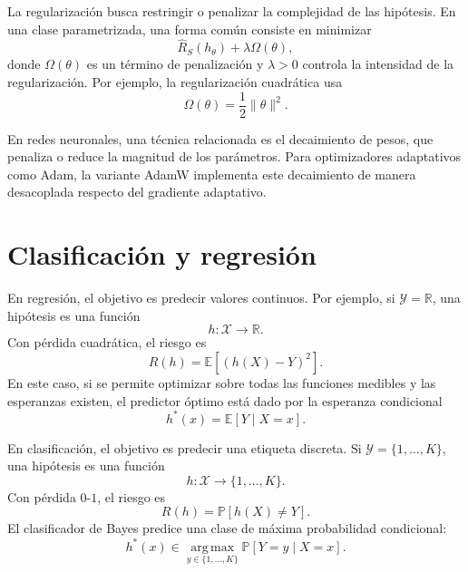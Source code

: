 \documentclass[11pt]{report}
\theoremstyle{definition}
\theoremstyle{plain}
\numberwithin{equation}{section}
\begin{document}
La regularización busca restringir o penalizar la complejidad de las hipótesis. En una clase parametrizada, una forma común consiste en minimizar
\begin{equation*}
    \widehat{R}_S(h_\theta)
    +
    \lambda\Omega(\theta),
\end{equation*}
donde \(\Omega(\theta)\) es un término de penalización y \(\lambda>0\) controla la intensidad de la regularización. Por ejemplo, la regularización cuadrática usa
\begin{equation*}
    \Omega(\theta)
    =
    \frac{1}{2}\|\theta\|^2.
\end{equation*}

En redes neuronales, una técnica relacionada es el decaimiento de pesos, que penaliza o reduce la magnitud de los parámetros. Para optimizadores adaptativos como Adam, la variante AdamW implementa este decaimiento de manera desacoplada respecto del gradiente adaptativo.

\section{Clasificación y regresión}

En regresión, el objetivo es predecir valores continuos. Por ejemplo, si \(\mathcal{Y}=\mathbb{R}\), una hipótesis es una función
\begin{equation*}
    h:\mathcal{X}\to\mathbb{R}.
\end{equation*}
Con pérdida cuadrática, el riesgo es
\begin{equation*}
    R(h)
    =
    \mathbb{E}[(h(X)-Y)^2].
\end{equation*}
En este caso, si se permite optimizar sobre todas las funciones medibles y las esperanzas existen, el predictor óptimo está dado por la esperanza condicional
\begin{equation*}
    h^*(x)
    =
    \mathbb{E}[Y\mid X=x].
\end{equation*}

En clasificación, el objetivo es predecir una etiqueta discreta. Si \(\mathcal{Y}=\{1,\ldots,K\}\), una hipótesis es una función
\begin{equation*}
    h:\mathcal{X}\to\{1,\ldots,K\}.
\end{equation*}
Con pérdida \(0\)-\(1\), el riesgo es
\begin{equation*}
    R(h)
    =
    \mathbb{P}[h(X)\neq Y].
\end{equation*}
El clasificador de Bayes predice una clase de máxima probabilidad condicional:
\begin{equation*}
    h^*(x)
    \in
    \operatorname*{arg\,max}_{y\in\{1,\ldots,K\}}
    \mathbb{P}[Y=y\mid X=x].
\end{equation*}
\end{document}
